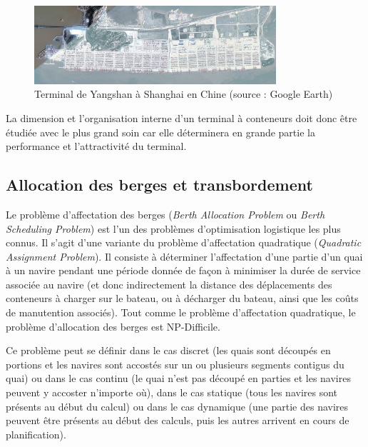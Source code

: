 \begin{figure}[ht]
  \begin{center}
    \includegraphics[width=0.8\textwidth]{chapitres/application/terminalDeYangshan.jpg}
    \caption{Terminal de Yangshan à Shanghai en Chine (source : Google Earth)}
    \label{fig:optTerminaux:shanghaiCT}
  \end{center}
\end{figure}

La dimension et l'organisation interne d'un terminal à conteneurs doit donc être étudiée avec le plus grand soin car elle déterminera en grande partie la performance et l'attractivité du terminal.

\subsection{Allocation des berges et transbordement}

Le problème d'affectation des berges (\textit{Berth Allocation Problem} ou \textit{Berth Scheduling Problem}) est l'un des problèmes d'optimisation logistique les plus connus. Il s'agit d'une variante du problème d'affectation quadratique (\textit{Quadratic Assignment Problem}). Il consiste à déterminer l'affectation d'une partie d'un quai à un navire pendant une période donnée de façon à minimiser la durée de service associée au navire (et donc indirectement la distance des déplacements des conteneurs à charger sur le bateau, ou à décharger du bateau, ainsi que les coûts de manutention associés). Tout comme le problème d'affectation quadratique, le problème d'allocation des berges est NP-Difficile.

Ce problème peut se définir dans le cas discret (les quais sont découpés en portions et les navires sont accostés sur un ou plusieurs segments contigus du quai) ou dans le cas continu (le quai n'est pas découpé en parties et les navires peuvent y accoster n'importe où), dans le cas statique (tous les navires sont présents au début du calcul) ou dans le cas dynamique (une partie des navires peuvent être présents au début des calculs, puis les autres arrivent en cours de planification).

